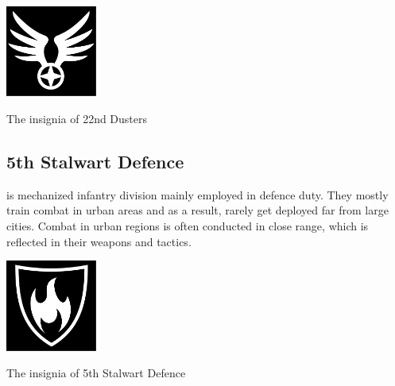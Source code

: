 \documentclass{tufte-book}
\begin{document}
\bigskip
{}

\begin{marginfigure}[0\baselineskip]
  \includegraphics[width=3cm]{winged-emblem}
  \caption{The insignia of 22nd Dusters}
  \label{fig:dusters}
\end{marginfigure}

\subsection{5th Stalwart Defence}

 is mechanized infantry division mainly
employed in defence duty. They mostly train combat in urban areas and as a
result, rarely get deployed far from large cities. Combat in urban regions
is often conducted in close range, which is reflected in their weapons and
tactics.

\begin{marginfigure}[0\baselineskip]
  \includegraphics[width=3cm]{fire-shield}
  \caption{The insignia of 5th Stalwart Defence}
  \label{fig:stalwart-defence}
\end{marginfigure}
\end{document}
